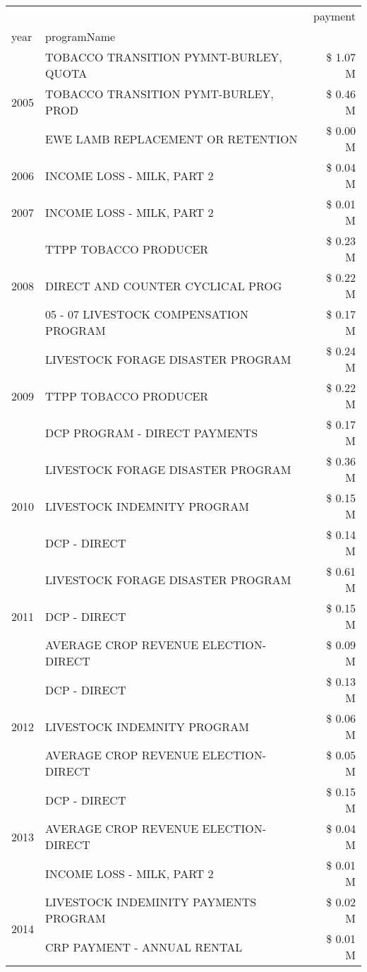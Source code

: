 \begin{tabular}{llr}
\toprule
 &  & payment \\
year & programName &  \\
\midrule
\multirow[t]{3}{*}{2005} & TOBACCO TRANSITION PYMNT-BURLEY, QUOTA & \$ 1.07 M \\
 & TOBACCO TRANSITION PYMT-BURLEY, PROD & \$ 0.46 M \\
 & EWE LAMB REPLACEMENT OR RETENTION & \$ 0.00 M \\
\cline{1-3}
2006 & INCOME LOSS - MILK, PART 2 & \$ 0.04 M \\
\cline{1-3}
2007 & INCOME LOSS - MILK, PART 2 & \$ 0.01 M \\
\cline{1-3}
\multirow[t]{3}{*}{2008} & TTPP TOBACCO PRODUCER & \$ 0.23 M \\
 & DIRECT AND COUNTER CYCLICAL PROG & \$ 0.22 M \\
 & 05 - 07 LIVESTOCK COMPENSATION PROGRAM & \$ 0.17 M \\
\cline{1-3}
\multirow[t]{3}{*}{2009} & LIVESTOCK FORAGE DISASTER  PROGRAM & \$ 0.24 M \\
 & TTPP TOBACCO PRODUCER & \$ 0.22 M \\
 & DCP PROGRAM - DIRECT PAYMENTS & \$ 0.17 M \\
\cline{1-3}
\multirow[t]{3}{*}{2010} & LIVESTOCK FORAGE DISASTER PROGRAM & \$ 0.36 M \\
 & LIVESTOCK INDEMNITY PROGRAM & \$ 0.15 M \\
 & DCP - DIRECT & \$ 0.14 M \\
\cline{1-3}
\multirow[t]{3}{*}{2011} & LIVESTOCK FORAGE DISASTER PROGRAM & \$ 0.61 M \\
 & DCP - DIRECT & \$ 0.15 M \\
 & AVERAGE CROP REVENUE ELECTION-DIRECT & \$ 0.09 M \\
\cline{1-3}
\multirow[t]{3}{*}{2012} & DCP - DIRECT & \$ 0.13 M \\
 & LIVESTOCK INDEMNITY PROGRAM & \$ 0.06 M \\
 & AVERAGE CROP REVENUE ELECTION-DIRECT & \$ 0.05 M \\
\cline{1-3}
\multirow[t]{3}{*}{2013} & DCP - DIRECT & \$ 0.15 M \\
 & AVERAGE CROP REVENUE ELECTION-DIRECT & \$ 0.04 M \\
 & INCOME LOSS - MILK, PART 2 & \$ 0.01 M \\
\cline{1-3}
\multirow[t]{3}{*}{2014} & LIVESTOCK INDEMINITY PAYMENTS PROGRAM & \$ 0.02 M \\
 & CRP PAYMENT - ANNUAL RENTAL & \$ 0.01 M \\

\end{tabular}
